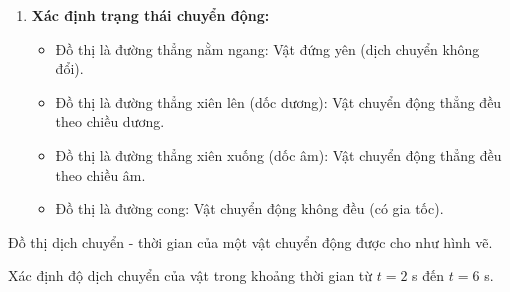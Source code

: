 \begin{phuongphap}
\begin{enumerate}
\begin{itemize}
    \end{itemize}
    \item \textbf{Xác định trạng thái chuyển động:}
    \begin{itemize}
        \item Đồ thị là đường thẳng nằm ngang: Vật đứng yên (dịch chuyển không đổi).
        \item Đồ thị là đường thẳng xiên lên (dốc dương): Vật chuyển động thẳng đều theo chiều dương.
        \item Đồ thị là đường thẳng xiên xuống (dốc âm): Vật chuyển động thẳng đều theo chiều âm.
        \item Đồ thị là đường cong: Vật chuyển động không đều (có gia tốc).
    \end{itemize}
\end{enumerate}
\end{phuongphap}

\begin{vidumau}
Đồ thị dịch chuyển - thời gian của một vật chuyển động được cho như hình vẽ.
\begin{center}
\end{center}
Xác định độ dịch chuyển của vật trong khoảng thời gian từ $t=2$ s đến $t=6$ s.
\choice
\end{vidumau}

